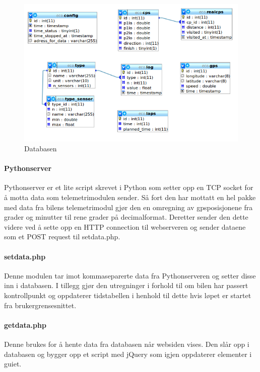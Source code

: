 \begin{figure}[H]
\includegraphics[width=\textwidth]{images/er.png}
\caption{Databasen}
\label{fig:er}
\end{figure}

\paragraph{Pythonserver}
Pythonserver er et lite script skrevet i Python som setter opp en TCP socket for å motta data som telemetrimodulen sender. Så fort den har mottatt en hel pakke med data fra bilens telemetrimodul gjør den en omregning av gpsposisjonene fra grader og minutter til rene grader på decimalformat. Deretter sender den dette videre ved å sette opp en HTTP connection til webserveren og sender dataene som et POST request til setdata.php.
\paragraph{setdata.php}
Denne modulen tar imot kommaseparerte data fra Pythonserveren og setter disse inn i databasen. I tillegg gjør den utregninger i forhold til om bilen har passert kontrollpunkt og oppdaterer tidstabellen i henhold til dette hvis løpet er startet fra brukergrensesnittet.
\paragraph{getdata.php}
Denne brukes for å hente data fra databasen når websiden vises. Den slår opp i databasen og bygger opp et script med jQuery\cite{jquery} som igjen oppdaterer elementer i guiet.
